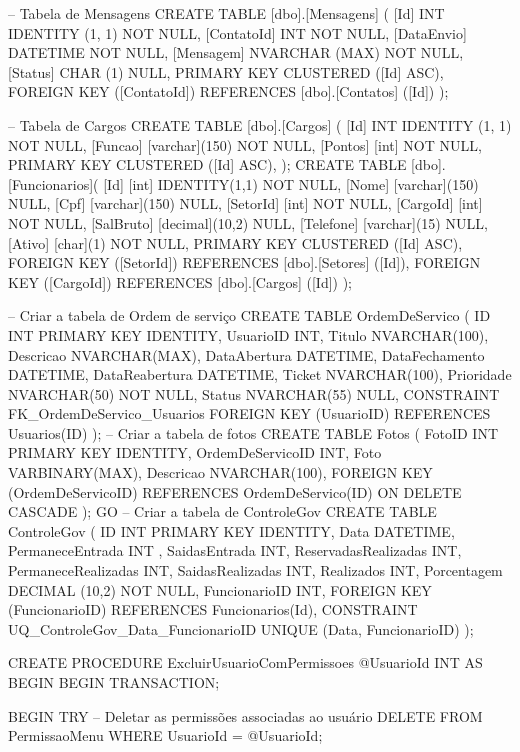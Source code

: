 -- Tabela de Mensagens
CREATE TABLE [dbo].[Mensagens] (
    [Id]        INT            IDENTITY (1, 1) NOT NULL,
    [ContatoId] INT            NOT NULL,
    [DataEnvio] DATETIME       NOT NULL,
    [Mensagem]  NVARCHAR (MAX) NOT NULL,
    [Status]    CHAR (1)       NULL,
    PRIMARY KEY CLUSTERED ([Id] ASC),
    FOREIGN KEY ([ContatoId]) REFERENCES [dbo].[Contatos] ([Id])
);

-- Tabela de Cargos
CREATE TABLE [dbo].[Cargos] (
    [Id]        INT            IDENTITY (1, 1) NOT NULL,
	[Funcao] [varchar](150) NOT NULL,
	[Pontos] [int] NOT NULL,
    PRIMARY KEY CLUSTERED ([Id] ASC),
);
CREATE TABLE [dbo].[Funcionarios](
	[Id] [int] IDENTITY(1,1) NOT NULL,
	[Nome] [varchar](150) NULL,
	[Cpf] [varchar](150) NULL,
	[SetorId] [int] NOT NULL,
	[CargoId] [int] NOT NULL,
	[SalBruto] [decimal](10,2) NULL,
	[Telefone] [varchar](15) NULL,
	[Ativo] [char](1) NOT NULL,
	PRIMARY KEY CLUSTERED ([Id] ASC),
	 FOREIGN KEY ([SetorId]) REFERENCES [dbo].[Setores] ([Id]),
	 FOREIGN KEY ([CargoId]) REFERENCES [dbo].[Cargos] ([Id])
);

-- Criar a tabela de Ordem de serviço
CREATE TABLE OrdemDeServico (
    ID INT PRIMARY KEY IDENTITY,
    UsuarioID INT,
    Titulo NVARCHAR(100),
    Descricao NVARCHAR(MAX),
    DataAbertura DATETIME,
    DataFechamento DATETIME,
    DataReabertura DATETIME,
    Ticket NVARCHAR(100),
    Prioridade NVARCHAR(50) NOT NULL,
    Status NVARCHAR(55) NULL,
    CONSTRAINT FK_OrdemDeServico_Usuarios FOREIGN KEY (UsuarioID) REFERENCES Usuarios(ID)
);
-- Criar a tabela de fotos
	CREATE TABLE Fotos (
    FotoID INT PRIMARY KEY IDENTITY,
    OrdemDeServicoID INT,
    Foto VARBINARY(MAX),
	Descricao NVARCHAR(100),
    FOREIGN KEY (OrdemDeServicoID) REFERENCES OrdemDeServico(ID) ON DELETE CASCADE
);
GO
-- Criar a tabela de ControleGov
CREATE TABLE ControleGov (
    ID INT PRIMARY KEY IDENTITY,
    Data DATETIME,
    PermaneceEntrada INT ,
    SaidasEntrada INT,
    ReservadasRealizadas INT,
    PermaneceRealizadas INT,
    SaidasRealizadas INT,
    Realizados INT,
    Porcentagem DECIMAL (10,2) NOT NULL,
    FuncionarioID INT,
    FOREIGN KEY (FuncionarioID) REFERENCES Funcionarios(Id),
    CONSTRAINT UQ_ControleGov_Data_FuncionarioID UNIQUE (Data, FuncionarioID)
);

CREATE PROCEDURE ExcluirUsuarioComPermissoes
    @UsuarioId INT
AS
BEGIN
    BEGIN TRANSACTION;
    
    BEGIN TRY
        -- Deletar as permissões associadas ao usuário
        DELETE FROM PermissaoMenu WHERE UsuarioId = @UsuarioId;
        

